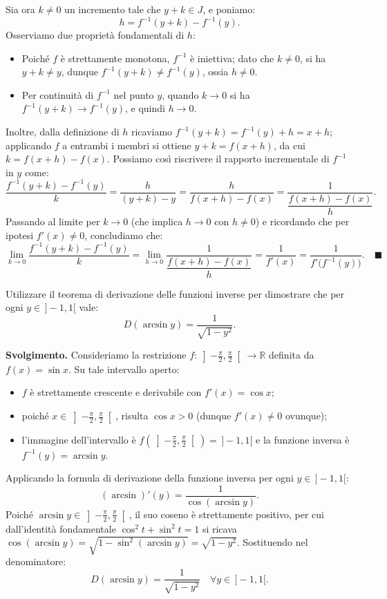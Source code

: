 Sia ora $k \neq 0$ un incremento tale che $y + k \in J$, e poniamo:
\[
    h = f^{-1}(y + k) - f^{-1}(y).
\]
Osserviamo due proprietà fondamentali di $h$:
\begin{itemize}
    \item Poiché $f$ è strettamente monotona, $f^{-1}$ è iniettiva; dato che $k \neq 0$, si ha $y + k \neq y$, dunque $f^{-1}(y + k) \neq f^{-1}(y)$, ossia $h \neq 0$.
    \item Per continuità di $f^{-1}$ nel punto $y$, quando $k \to 0$ si ha $f^{-1}(y + k) \to f^{-1}(y)$, e quindi $h \to 0$.
\end{itemize}
Inoltre, dalla definizione di $h$ ricaviamo $f^{-1}(y + k) = f^{-1}(y) + h = x + h$; applicando $f$ a entrambi i membri si ottiene $y + k = f(x + h)$, da cui $k = f(x + h) - f(x)$. Possiamo così riscrivere il rapporto incrementale di $f^{-1}$ in $y$ come:
\[
    \frac{f^{-1}(y + k) - f^{-1}(y)}{k} = \frac{h}{(y + k) - y} = \frac{h}{f(x + h) - f(x)} = \frac{1}{\dfrac{f(x + h) - f(x)}{h}}.
\]
Passando al limite per $k \to 0$ (che implica $h \to 0$ con $h \neq 0$) e ricordando che per ipotesi $f'(x) \neq 0$, concludiamo che:
\[
    \lim_{k \to 0} \frac{f^{-1}(y + k) - f^{-1}(y)}{k} = \lim_{h \to 0} \frac{1}{\dfrac{f(x + h) - f(x)}{h}} = \frac{1}{f'(x)} = \frac{1}{f'\bigl(f^{-1}(y)\bigr)}. \quad \blacksquare
\]

\begin{esbox}
Utilizzare il teorema di derivazione delle funzioni inverse per dimostrare che per ogni $y \in \,]-1, 1[$ vale:
\[
    D(\arcsin y) = \frac{1}{\sqrt{1 - y^2}}.
\]

\medskip
\noindent\textbf{Svolgimento.}
Consideriamo la restrizione $f \colon \left]-\frac{\pi}{2}, \frac{\pi}{2}\right[ \to \mathbb{R}$ definita da $f(x) = \sin x$. Su tale intervallo aperto:
\begin{itemize}
    \item $f$ è strettamente crescente e derivabile con $f'(x) = \cos x$;
    \item poiché $x \in \left]-\frac{\pi}{2}, \frac{\pi}{2}\right[$, risulta $\cos x > 0$ (dunque $f'(x) \neq 0$ ovunque);
    \item l'immagine dell'intervallo è $f\!\left(\left]-\frac{\pi}{2}, \frac{\pi}{2}\right[\right) = \,]-1, 1[$ e la funzione inversa è $f^{-1}(y) = \arcsin y$.
\end{itemize}
Applicando la formula di derivazione della funzione inversa per ogni $y \in \,]-1, 1[$:
\[
    (\arcsin)'(y) = \frac{1}{\cos(\arcsin y)}.
\]
Poiché $\arcsin y \in \left]-\frac{\pi}{2}, \frac{\pi}{2}\right[$, il suo coseno è strettamente positivo, per cui dall'identità fondamentale $\cos^2 t + \sin^2 t = 1$ si ricava $\cos(\arcsin y) = \sqrt{1 - \sin^2(\arcsin y)} = \sqrt{1 - y^2}$. Sostituendo nel denominatore:
\[
    D(\arcsin y) = \frac{1}{\sqrt{1 - y^2}} \quad \forall y \in \,]-1, 1[.
\]
\end{esbox}

